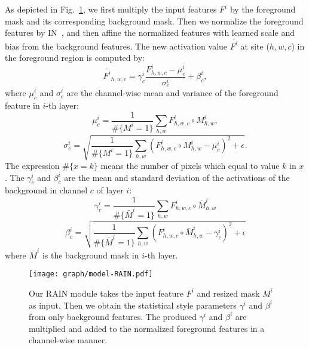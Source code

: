 \documentclass[final]{cvpr}
\begin{document}
As depicted in Fig.~\ref{fig:rain}, we first multiply the input features $F^{i}$ by the foreground mask and its corresponding background mask. Then we normalize the foreground features by IN~\cite{ulyanov2016instance}, and then affine the normalized features with learned scale and bias from the background features. The new activation value $\bar{F^{i}}$ at site ($h, w, c$) in the foreground region is computed by:
\begin{equation}
\label{equ:rain}
\bar{F^{i}}_{h, w, c}=\gamma_{c}^{i}\frac{F^{i}_{h,w,c}-\mu_{c}^{i}}{\sigma_{c}^{i}} + \beta_{c}^{i},
\end{equation}
where $\mu_{c}^{i}$ and $\sigma_{c}^{i}$ are the channel-wise mean and variance of the foreground feature in $i$-th layer:
\begin{equation}
\label{equ:mean_foreground}
\mu_{c}^{i} = \frac{1}{\#\{M^{i}=1\}}\sum_{h,w}F^{i}_{h,w,c}\circ M^{i}_{h,w},
\end{equation}
\begin{equation}
\label{equ:var_foreground}
\sigma_{c}^{i} = \sqrt{\frac{1}{\#\{M^{i}=1\}}\sum_{h,w}(F^{i}_{h,w,c}\circ M^{i}_{h,w}-\mu_{c}^{i})^2 + \epsilon} .
\end{equation}
The expression $\#\{x=k\}$ means the number of pixels which equal to value $k$ in $x$. The $\gamma_{c}^{i}$ and $\beta_{c}^{i}$ are the mean and standard deviation of the activations of the background in channel $c$ of layer $i$:
\begin{equation}
\label{equ:mean_background}
\gamma_{c}^{i} = \frac{1}{\#\{\bar{M}^{i}=1\}}\sum_{h,w}F^{i}_{h,w,c}\circ \bar{M}^{i}_{h,w}
\end{equation}
\begin{equation}
\label{equ:var_background}
\beta_{c}^{i} = \sqrt{\frac{1}{\#\{\bar{M}^{i}=1\}}\sum_{h,w}(F^{i}_{h,w,c}\circ \bar{M}^{i}_{h,w}-\gamma_{c}^{i})^2 + \epsilon}
\end{equation}
where $\bar{M}^{i}$ is the background mask in $i$-th layer. 


\begin{figure}
\begin{center}
\texttt{[image: graph/model-RAIN.pdf]}
\end{center}
   \caption{Our RAIN module takes the input feature $F^i$ and resized mask $M^i$ as input. Then we obtain the statistical style parameters $\gamma^i$ and $\beta^i$ from only background features. The produced $\gamma^i$ and $\beta^i$ are multiplied and added to the normalized foreground features in a channel-wise manner. }
   \label{fig:rain}
\end{figure}
\end{document}
